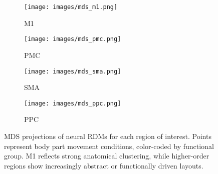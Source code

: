 \documentclass{article}
\begin{document}
\begin{figure}[!htbp]
    \centering
    \begin{subfigure}[b]{0.45\textwidth}
        \centering
        \texttt{[image: images/mds\_m1.png]}
        \caption{M1}
        \label{fig:mds_m1}
    \end{subfigure}
    \hfill
    \begin{subfigure}[b]{0.45\textwidth}
        \centering
        \texttt{[image: images/mds\_pmc.png]}
        \caption{PMC}
        \label{fig:mds_pmc}
    \end{subfigure}
    \vspace{0.5em}
    \begin{subfigure}[b]{0.45\textwidth}
        \centering
        \texttt{[image: images/mds\_sma.png]}
        \caption{SMA}
        \label{fig:mds_sma}
    \end{subfigure}
    \hfill
    \begin{subfigure}[b]{0.45\textwidth}
        \centering
        \texttt{[image: images/mds\_ppc.png]}
        \caption{PPC}
        \label{fig:mds_ppc}
    \end{subfigure}
\caption{MDS projections of neural RDMs for each region of interest. Points represent body part movement conditions, color-coded by functional group. M1 reflects strong anatomical clustering, while higher-order regions show increasingly abstract or functionally driven layouts.}
\label{fig:mds_all}
\end{figure}



\end{document}
